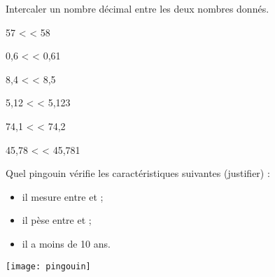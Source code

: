 \begin{colonne*exercice}

\medskip


\begin{exercice} %
   Intercaler un nombre décimal entre les deux nombres donnés.
   \begin{colenumerate}{2}
      \item 57 < \pfh < 58
      \item 0,6 < \pfh < 0,61
      \item 8,4 < \pfh < 8,5
      \item 5,12 < \pfh < 5,123
      \item 74,1 < \pfh < 74,2
      \item 45,78 < \pfh < 45,781
   \end{colenumerate}
\end{exercice}


\medskip


\begin{exercice} %
   Quel pingouin vérifie les caractéristiques suivantes (justifier) :
   \begin{itemize}
      \item il mesure entre  et  ;
      \item il pèse entre  et  ;
      \item il a moins de 10 ans.
   \end{itemize}
  \begin{center}
      \texttt{[image: pingouin]}
   \end{center}
\end{exercice}


\end{colonne*exercice}

